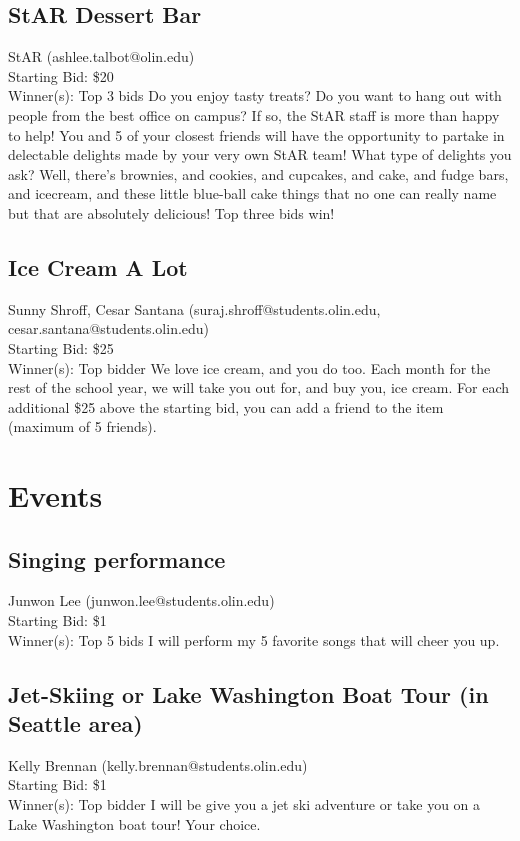 \documentclass[11pt]{article}
\begin{document}
\subsection{StAR Dessert Bar}
StAR (ashlee.talbot@olin.edu) \\
Starting Bid: \$20 \\
Winner(s): 
Top 3 bids\newline
Do you enjoy tasty treats? Do you want to hang out with people from the best office on campus?  If so, the StAR staff is more than happy to help! You and 5 of your closest friends will have the opportunity to partake in delectable delights made by your very own StAR team! What type of delights you ask? Well, there's brownies, and cookies, and cupcakes, and cake, and fudge bars, and icecream, and these little blue-ball cake things that no one can really name but that are absolutely delicious! Top three bids win!
\subsection{Ice Cream A Lot}
Sunny Shroff, Cesar Santana (suraj.shroff@students.olin.edu, cesar.santana@students.olin.edu) \\
Starting Bid: \$25 \\
Winner(s): 
Top bidder\newline
We love ice cream, and you do too. Each month for the rest of the school year, we will take you out for, and buy you, ice cream. For each additional \$25 above the starting bid, you can add a friend to the item (maximum of 5 friends).
\section{Events}
\subsection{Singing performance}
Junwon Lee (junwon.lee@students.olin.edu) \\
Starting Bid: \$1 \\
Winner(s): 
Top 5 bids\newline
I will perform my 5 favorite songs that will cheer you up.
\subsection{Jet-Skiing or Lake Washington Boat Tour (in Seattle area)}
Kelly Brennan (kelly.brennan@students.olin.edu) \\
Starting Bid: \$1 \\
Winner(s): 
Top bidder\newline
I will be give you a jet ski adventure or take you on a Lake Washington boat tour! Your choice. 
\end{document}
